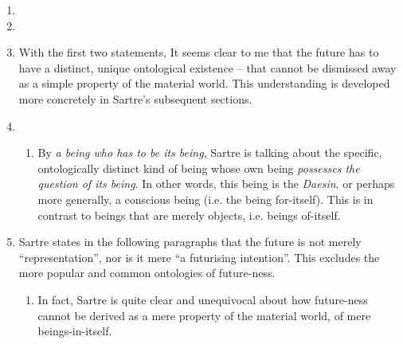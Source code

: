 \begin{enumerate}
  \item {}
  \item {}
  \item With the first two statements,  It seems clear to me that the future has to have a distinct, unique ontological existence -- that cannot be dismissed away as a simple property of the material world. This understanding is developed more concretely in Sartre's subsequent sections.
  \item {}
  \begin{enumerate}
    \item By \emph{a being who has to be its being}, Sartre is talking about the specific, ontologically distinct kind of being whose own being \emph{possesses the question of its being}. In other words, this being is the \emph{Daesin}, or perhaps more generally, a conscious being (i.e. the being for-itself). This is in contrast to beings that are merely objects, i.e. beings of-itself.
  \end{enumerate}
  \item Sartre states in the following paragraphs that the future is not merely \enquote{representation}, nor is it mere \enquote{a futurising intention}. This excludes the more popular and common ontologies of future-ness.
  \begin{enumerate}
    \item In fact, Sartre is quite clear and unequivocal about how future-ness cannot be derived as a mere property of the material world, of mere beings-in-itself.

\end{enumerate}
\end{enumerate}
